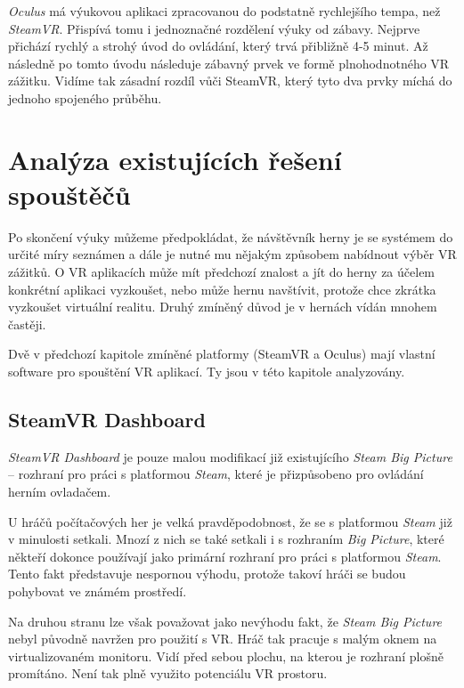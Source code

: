 \emph{Oculus} má výukovou aplikaci zpracovanou do podstatně rychlejšího
tempa, než \emph{SteamVR}. Přispívá tomu i jednoznačné rozdělení výuky
od zábavy. Nejprve přichází rychlý a strohý úvod do ovládání, který trvá
přibližně 4-5 minut. Až následně po tomto úvodu následuje zábavný prvek
ve formě plnohodnotného VR zážitku. Vidíme tak zásadní rozdíl vůči
SteamVR, který tyto dva prvky míchá do jednoho spojeného průběhu.

\section{Analýza existujících řešení
spouštěčů}\label{analuxfdza-existujuxedcuxedch-ux159eux161enuxed-spouux161tux11bux10dux16f}

Po skončení výuky můžeme předpokládat, že návštěvník herny je se
systémem do určité míry seznámen a dále je nutné mu nějakým způsobem
nabídnout výběr VR zážitků. O VR aplikacích může mít předchozí znalost a
jít do herny za účelem konkrétní aplikaci vyzkoušet, nebo může hernu
navštívit, protože chce zkrátka vyzkoušet virtuální realitu. Druhý
zmíněný důvod je v hernách vídán mnohem častěji.

Dvě v předchozí kapitole zmíněné platformy (SteamVR a Oculus) mají
vlastní software pro spouštění VR aplikací. Ty jsou v této kapitole
analyzovány.

\subsection{SteamVR Dashboard}\label{steamvr-dashboard}

\emph{SteamVR Dashboard} je pouze malou modifikací již existujícího
\emph{Steam Big Picture} -- rozhraní pro práci s platformou
\emph{Steam}, které je přizpůsobeno pro ovládání herním ovladačem.

U hráčů počítačových her je velká pravděpodobnost, že se s platformou
\emph{Steam} již v minulosti setkali. Mnozí z nich se také setkali i s
rozhraním \emph{Big Picture}, které někteří dokonce používají jako
primární rozhraní pro práci s platformou \emph{Steam}. Tento fakt
představuje nespornou výhodu, protože takoví hráči se budou pohybovat ve
známém prostředí.

Na druhou stranu lze však považovat jako nevýhodu fakt, že \emph{Steam
Big Picture} nebyl původně navržen pro použití s VR. Hráč tak pracuje s
malým oknem na virtualizovaném monitoru. Vidí před sebou plochu, na
kterou je rozhraní plošně promítáno. Není tak plně využito potenciálu VR
prostoru.


